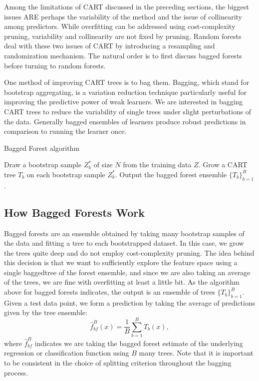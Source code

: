 \documentclass[12pt,twoside]{reedthesis}
\theoremstyle{definition}
\theoremstyle{definition}
\theoremstyle{definition}
\theoremstyle{remark}
\begin{document}
Among the limitations of CART discussed in the preceding sections, the
biggest issues ARE perhaps the variability of the method and the issue
of collinearity among predictors. While overfitting can be addressed
using cost-complexity pruning, variability and collinearity are not
fixed by pruning. Random forests deal with these two issues of CART by
introducing a resampling and randomization mechanism. The natural order
is to first discuss bagged forests before turning to random forests.
\par

One method of improving CART trees is to bag them. Bagging, which stand
for bootstrap aggregating, is a variation reduction technique
particularly useful for improving the predictive power of weak learners.
We are interested in bagging CART trees to reduce the variability of
single trees under slight perturbations of the data. Generally bagged
ensembles of learners produce robust predictions in comparison to
running the learner once. \par
\begin{algorithm}
        \caption{Bagged Forest algorithm}\label{bagged forest}
        \begin{algorithmic}[1]
            \State Draw a bootstrap sample $Z_b^*$ of size $N$ from the training data $Z$.
            \State Grow a CART tree $T_b$ on each bootstrap sample $Z_b^*$.
            \EndFor
            \State Output the bagged forest ensemble $\{T_b\}_{b=1}^B$.
        \end{algorithmic}
    \end{algorithm}
\subsection{How Bagged Forests Work}\label{how-bagged-forests-work}

Bagged forests are an ensemble obtained by taking many bootstrap samples
of the data and fitting a tree to each bootstrapped dataset. In this
case, we grow the trees quite deep and do not employ cost-complexity
pruning. The idea behind this decision is that we want to sufficiently
explore the feature space using a single baggedtree of the forest
ensemble, and since we are also taking an average of the trees, we are
fine with overfitting at least a little bit. As the algorithm above for
bagged forests indicates, the output is an ensemble of trees
\(\{T_b\}_{b=1}^B\). Given a test data point, we form a prediction by
taking the average of predictions given by the tree ensemble:
\[\hat{f}_{bf}^B(x)=\frac{1}{B}\sum_{b=1}^B T_b(x),\] where
\(\hat{f}_{bf}^B\) indicates we are taking the bagged forest estimate of
the underlying regression or classification function using \(B\) many
trees. Note that it is important to be consistent in the choice of
splitting criterion throughout the bagging process. \par
\end{document}
